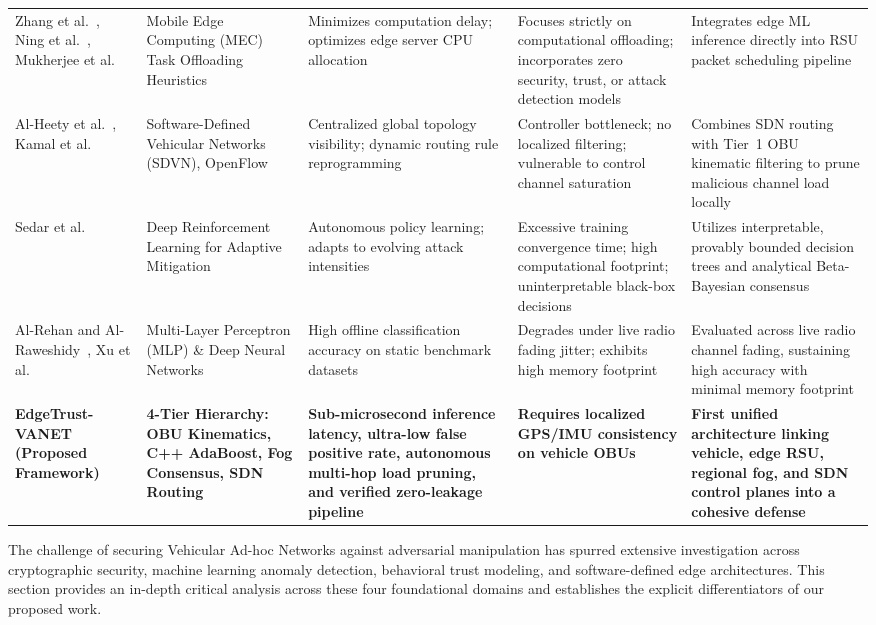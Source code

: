 \documentclass[conference]{IEEEtran}
\begin{document}
\begin{table}[t]
{\begin{tabular}{p{3.2cm}p{3.0cm}p{2.8cm}p{3.4cm}p{4.2cm}}
\addlinespace
Zhang et al.~\cite{fogvanet}, Ning et al.~\cite{ning2019mec}, Mukherjee et al.~\cite{hou2016vehicularfog} & Mobile Edge Computing (MEC) Task Offloading Heuristics & Minimizes computation delay; optimizes edge server CPU allocation & Focuses strictly on computational offloading; incorporates zero security, trust, or attack detection models & Integrates edge ML inference directly into RSU packet scheduling pipeline \\
\addlinespace
Al-Heety et al.~\cite{sdnvanet}, Kamal et al.~\cite{kamal2020sdn} & Software-Defined Vehicular Networks (SDVN), OpenFlow & Centralized global topology visibility; dynamic routing rule reprogramming & Controller bottleneck; no localized filtering; vulnerable to control channel saturation & Combines SDN routing with Tier~1 OBU kinematic filtering to prune malicious channel load locally \\
\addlinespace
Sedar et al.~\cite{sedar2020reinforcement} & Deep Reinforcement Learning for Adaptive Mitigation & Autonomous policy learning; adapts to evolving attack intensities & Excessive training convergence time; high computational footprint; uninterpretable black-box decisions & Utilizes interpretable, provably bounded decision trees and analytical Beta-Bayesian consensus \\
\addlinespace
Al-Rehan and Al-Raweshidy~\cite{alrehan2019machine}, Xu et al.~\cite{xu2022misbehavior} & Multi-Layer Perceptron (MLP) \& Deep Neural Networks & High offline classification accuracy on static benchmark datasets & Degrades under live radio fading jitter; exhibits high memory footprint & Evaluated across live radio channel fading, sustaining high accuracy with minimal memory footprint \\
\addlinespace
\textbf{EdgeTrust-VANET} \newline \textbf{(Proposed Framework)}~\cite{edgetrust} & \textbf{4-Tier Hierarchy: OBU Kinematics, C++ AdaBoost, Fog Consensus, SDN Routing} & \textbf{Sub-microsecond inference latency, ultra-low false positive rate, autonomous multi-hop load pruning, and verified zero-leakage pipeline} & \textbf{Requires localized GPS/IMU consistency on vehicle OBUs} & \textbf{First unified architecture linking vehicle, edge RSU, regional fog, and SDN control planes into a cohesive defense} \\
\bottomrule
\end{tabular}%
}
\end{table}



The challenge of securing Vehicular Ad-hoc Networks against adversarial manipulation has spurred extensive investigation across cryptographic security, machine learning anomaly detection, behavioral trust modeling, and software-defined edge architectures. This section provides an in-depth critical analysis across these four foundational domains and establishes the explicit differentiators of our proposed work.
\end{document}
